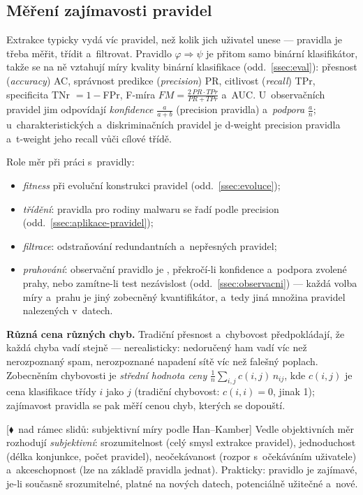 \documentclass[11pt,a4paper]{article}
\theoremstyle{definition}
\newcommand{\mimoq}[1]{\textcolor{markcol}{\textsf{\footnotesize[$\blacklozenge$~nad rámec slidů: #1]}}}
\begin{document}
\subsection{Měření zajímavosti pravidel}
\label{ssec:zajimavost}

Extrakce typicky vydá víc pravidel, než kolik jich uživatel unese --- pravidla je třeba
měřit, třídit a~filtrovat. Pravidlo $\varphi\Rightarrow\psi$ je přitom samo binární
klasifikátor, takže se na ně vztahují míry kvality binární klasifikace
(odd.~\ref{ssec:eval}): přesnost (\emph{accuracy}) AC, správnost predikce
(\emph{precision}) PR, citlivost (\emph{recall}) TPr, specificita TNr $=1-{}$FPr, F-míra
$FM=\frac{2\,PR\cdot TPr}{PR+TPr}$ a~AUC. U~observačních pravidel jim odpovídají
\emph{konfidence} $\tfrac{a}{a+b}$ (precision pravidla) a~\emph{podpora} $\tfrac{a}{n}$;
u~charakteristických a~diskriminačních pravidel je d-weight precision pravidla
a~t-weight jeho recall vůči cílové třídě.

Role měr při práci s~pravidly:
\begin{itemize}
\item \emph{fitness} při evoluční konstrukci pravidel (odd.~\ref{ssec:evoluce});
\item \emph{třídění}: pravidla pro rodiny malwaru se řadí podle precision
      (odd.~\ref{ssec:aplikace-pravidel});
\item \emph{filtrace}: odstraňování redundantních a~nepřesných pravidel;
\item \emph{prahování}: observační pravidlo je , překročí-li konfidence
      a~podpora zvolené prahy, nebo zamítne-li test nezávislost
      (odd.~\ref{ssec:observacni}) --- každá volba míry a~prahu je jiný zobecněný
      kvantifikátor, a~tedy jiná množina pravidel nalezených v~datech.
\end{itemize}

\textbf{Různá cena různých chyb.} Tradiční přesnost a~chybovost předpokládají, že každá
chyba vadí stejně --- nerealisticky: nedoručený ham vadí víc než nerozpoznaný spam,
nerozpoznané napadení sítě víc než falešný poplach. Zobecněním chybovosti je
\emph{střední hodnota ceny} $\frac1n\sum_{i,j}c(i,j)\,n_{ij}$, kde $c(i,j)$ je cena
klasifikace třídy $i$ jako $j$ (tradiční chybovost: $c(i,i)=0$, jinak 1); zajímavost
pravidla se pak měří cenou chyb, kterých se dopouští.

\mimoq{subjektivní míry podle Han--Kamber} Vedle objektivních měr rozhodují
\emph{subjektivní}: srozumitelnost (celý smysl extrakce pravidel), jednoduchost (délka
konjunkce, počet pravidel), neočekávanost (rozpor s~očekáváním uživatele)
a~akceschopnost (lze na základě pravidla jednat). Prakticky: pravidlo je zajímavé, je-li
současně srozumitelné, platné na nových datech, potenciálně užitečné a~nové.
\end{document}
